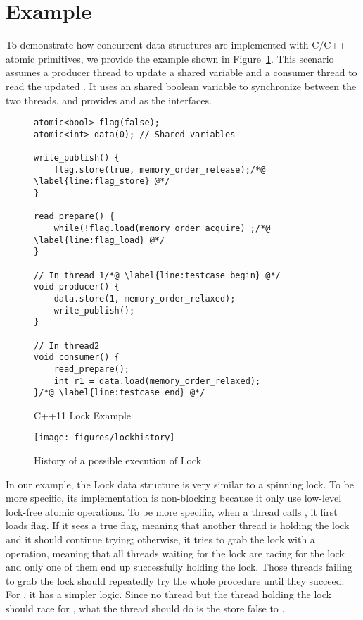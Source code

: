\section{Example}
\label{sec:example}

To demonstrate how concurrent data structures are implemented with C/C++ atomic
primitives, we provide the example shown in Figure~\ref{fig:example}. This
scenario assumes a producer thread to update a shared variable  and a
consumer thread to read the updated . It uses an shared boolean
variable  to synchronize between the two threads, and provides
 and  as the interfaces.

\begin{figure}[h]
\begin{lstlisting}
atomic<bool> flag(false);
atomic<int> data(0); // Shared variables

write_publish() {
	flag.store(true, memory_order_release);/*@ \label{line:flag_store} @*/
}

read_prepare() {
	while(!flag.load(memory_order_acquire) ;/*@ \label{line:flag_load} @*/
}

// In thread 1/*@ \label{line:testcase_begin} @*/
void producer() {
	data.store(1, memory_order_relaxed);
	write_publish();
}

// In thread2
void consumer() {
	read_prepare();
	int r1 = data.load(memory_order_relaxed);
}/*@ \label{line:testcase_end} @*/
\end{lstlisting}
\caption{\label{fig:example}C++11 Lock Example}
\end{figure}

\begin{figure}[t]
        \centering
	\texttt{[image: figures/lockhistory]}
		\caption{\label{fig:lockhistory} History of a possible execution of Lock}
\end{figure}

In our example, the Lock data structure is very similar to a spinning lock. To
be more specific, its implementation is non-blocking because it only use
low-level lock-free atomic operations. To be more specific, when a thread calls
, it first loads flag. If it sees a true flag, meaning that another
thread is holding the lock and it should continue trying; otherwise, it tries to
grab the lock with a  operation, meaning that
all threads waiting for the lock are racing for the lock and only one of them
end up successfully holding the lock. Those threads failing to grab the lock
should repeatedly try the whole procedure until they succeed. For
, it has a simpler logic. Since no thread but the thread holding
the lock should race for , what the thread should do is the store
false to .

